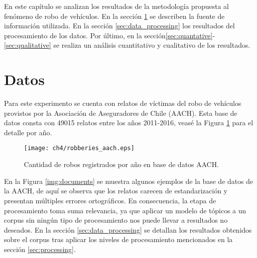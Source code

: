 En este capítulo se analizan los resultados de la metodología propuesta al fenómeno de robo de vehículos. En la sección \ref{sec:data} se describen la fuente de información utilizada. En la sección \ref{sec:data_processing} los resultados del procesamiento de los datos. Por último, en la sección\ref{sec:quantative}-\ref{sec:qualitative} se realiza un análisis cuantitativo y cualitativo de los resultados.

\section{Datos}
\label{sec:data}

Para este experimento se cuenta con relatos de víctimas del robo de vehículos provistos por la Asociación de Aseguradores de Chile (AACH). Esta base de datos consta con 49015 relatos entre los años 2011-2016, veasé la Figura \ref{img:robberies_aach} para el detalle por año.

\begin{figure}
\texttt{[image: ch4/robberies\_aach.eps]}
\caption{Cantidad de robos registrados por año en base de datos AACH.}
\label{img:robberies_aach}
\end{figure}

En la Figura \ref{img:documents} se muestra algunos ejemplos de la base de datos de la AACH, de aquí se observa que los relatos carecen de estandarización y presentan múltiples errores ortográficos. En consecuencia, la etapa de procesamiento toma suma relevancia, ya que aplicar un modelo de tópicos a un corpus sin ningún tipo de procesamiento nos puede llevar a resultados no deseados. En la sección \ref{sec:data_processing} se detallan los resultados obtenidos sobre el corpus tras aplicar los niveles de procesamiento mencionados en la sección \ref{sec:processing}.


